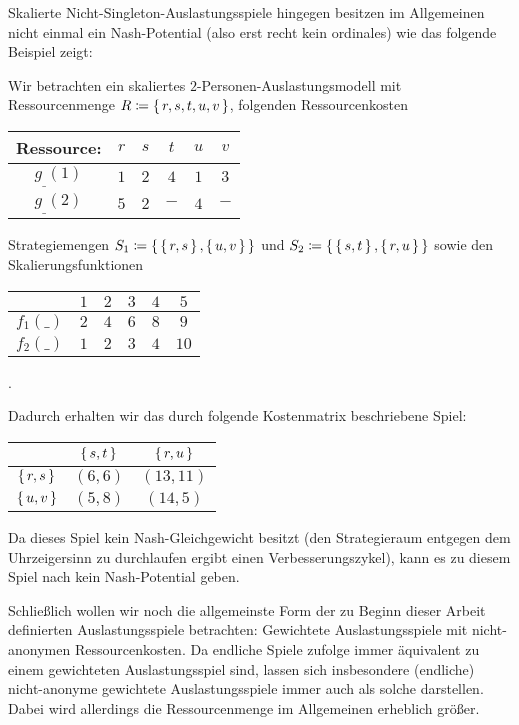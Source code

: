 Skalierte Nicht-Singleton-Auslastungsspiele hingegen besitzen im Allgemeinen nicht einmal ein Nash-Potential (also erst recht kein ordinales) wie das folgende Beispiel zeigt:

\begin{bsp}\label{bsp:NichtSingeltonSkalAusl}
	Wir betrachten ein skaliertes $2$-Personen-Auslastungsmodell mit Ressourcenmenge $R \coloneqq \set{r, s, t, u, v}$, folgenden Ressourcenkosten
	\begin{center}\begin{tabular}{c|ccccc}
		Ressource:	& $r$ 	& $s$	& $t$	& $u$	& $v$	\\\hline\hline
		$g_{\_}(1)$	& $1$	& $2$	& $4$	& $1$	& $3$	\\\hline
		$g_{\_}(2)$	& $5$	& $2$ 	& $-$	& $4$	& $-$
	\end{tabular}\end{center}
	Strategiemengen $S_1 \coloneqq \set{\set{r,s}, \set{u,v}}$ und $S_2 \coloneqq \set{\set{s,t}, \set{r,u}}$ sowie den Skalierungsfunktionen
	\begin{center}\begin{tabular}{c|ccccc}
						& $1$ 	& $2$	& $3$	& $4$	& $5$	\\\hline\hline
			$f_1(\_)$	& $2$	& $4$	& $6$	& $8$	& $9$	\\\hline
			$f_2(\_)$	& $1$	& $2$ 	& $3$	& $4$	& $10$
	\end{tabular}.\end{center}
	Dadurch erhalten wir das durch folgende Kostenmatrix beschriebene Spiel:	
		\begin{center}\begin{tabular}{c||c|c}
						& $\set{s,t}$	& $\set{r,u}$	\\\hline\hline
			$\set{r,s}$	& $(6,6)$		& $(13,11)$		\\\hline
			$\set{u,v}$	& $(5,8)$		& $(14,5)$ 
		\end{tabular}\end{center}
	Da dieses Spiel kein Nash-Gleichgewicht besitzt (den Strategieraum entgegen dem Uhrzeigersinn zu durchlaufen ergibt einen Verbesserungszykel), kann es zu diesem Spiel nach  kein Nash-Potential geben.
\end{bsp}

Schließlich wollen wir noch die allgemeinste Form der zu Beginn dieser Arbeit definierten Auslastungsspiele betrachten: Gewichtete Auslastungsspiele mit nicht-anonymen Ressourcenkosten. Da endliche Spiele  zufolge immer äquivalent zu einem gewichteten Auslastungsspiel sind, lassen sich insbesondere (endliche) nicht-anonyme gewichtete Auslastungsspiele immer auch als solche darstellen. Dabei wird allerdings die Ressourcenmenge im Allgemeinen erheblich größer. 

